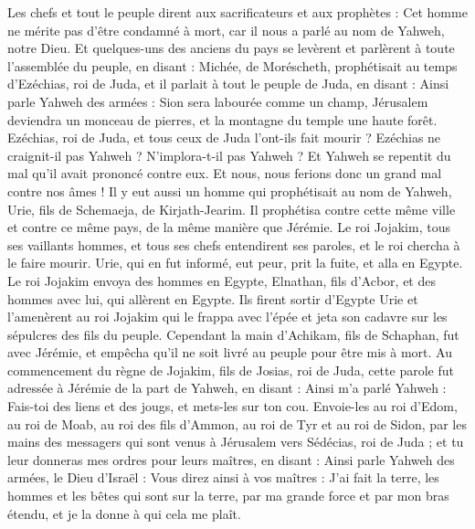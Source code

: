 \begin{multicols}{2}
Les chefs et tout le peuple dirent aux sacrificateurs et aux prophètes : Cet homme ne mérite pas d'être condamné à mort, car il nous a parlé au nom de Yahweh, notre Dieu.
Et quelques-uns des anciens du pays se levèrent et parlèrent à toute l'assemblée du peuple, en disant :
Michée, de Moréscheth, prophétisait au temps d'Ezéchias, roi de Juda, et il parlait à tout le peuple de Juda, en disant : Ainsi parle Yahweh des armées : Sion sera labourée comme un champ, Jérusalem deviendra un monceau de pierres, et la montagne du temple une haute forêt.
Ezéchias, roi de Juda, et tous ceux de Juda l'ont-ils fait mourir ? Ezéchias ne craignit-il pas Yahweh ? N'implora-t-il pas Yahweh ? Et Yahweh se repentit du mal qu'il avait prononcé contre eux. Et nous, nous ferions donc un grand mal contre nos âmes !
Il y eut aussi un homme qui prophétisait au nom de Yahweh, Urie, fils de Schemaeja, de Kirjath-Jearim. Il prophétisa contre cette même ville et contre ce même pays, de la même manière que Jérémie.
Le roi Jojakim, tous ses vaillants hommes, et tous ses chefs entendirent ses paroles, et le roi chercha à le faire mourir. Urie, qui en fut informé, eut peur, prit la fuite, et alla en Egypte.
Le roi Jojakim envoya des hommes en Egypte, Elnathan, fils d'Acbor, et des hommes avec lui, qui allèrent en Egypte.
Ils firent sortir d'Egypte Urie et l'amenèrent au roi Jojakim qui le frappa avec l'épée et jeta son cadavre sur les sépulcres des fils du peuple.
Cependant la main d'Achikam, fils de Schaphan, fut avec Jérémie, et empêcha qu'il ne soit livré au peuple pour être mis à mort.
\VerseOne{}Au commencement du règne de Jojakim, fils de Josias, roi de Juda, cette parole fut adressée à Jérémie de la part de Yahweh, en disant :
Ainsi m'a parlé Yahweh : Fais-toi des liens et des jougs, et mets-les sur ton cou.
Envoie-les au roi d'Edom, au roi de Moab, au roi des fils d'Ammon, au roi de Tyr et au roi de Sidon, par les mains des messagers qui sont venus à Jérusalem vers Sédécias, roi de Juda ;
et tu leur donneras mes ordres pour leurs maîtres, en disant : Ainsi parle Yahweh des armées, le Dieu d'Israël : Vous direz ainsi à vos maîtres :
J'ai fait la terre, les hommes et les bêtes qui sont sur la terre, par ma grande force et par mon bras étendu, et je la donne à qui cela me plaît.

\end{multicols}
